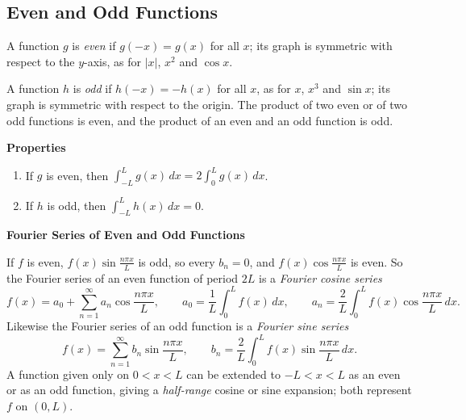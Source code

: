 \documentclass[11pt,a4paper]{article}
\theoremstyle{definition}
\newcommand{\subhead}[1]{%
  \par\medskip\noindent\textbf{#1}\par\nobreak\smallskip}
\begin{document}
{\color[wave]{485}\subsection{Even and Odd Functions}}

A function $g$ is \emph{even} if $g(-x) = g(x)$ for all $x$; its graph is
symmetric with respect to the $y$-axis, as for $|x|$, $x^2$ and $\cos x$.

\begin{figure}[H]
\centering
{}
\end{figure}

A function $h$ is \emph{odd} if $h(-x) = -h(x)$ for all $x$, as for $x$, $x^3$
and $\sin x$; its graph is symmetric with respect to the origin. The product of
two even or of two odd functions is even, and the product of an even and an odd
function is odd.

\subhead{Properties}
\begin{enumerate}
\item If $g$ is even, then $\int^L_{-L} g(x)\,dx = 2\int^L_0 g(x)\,dx$.

\item If $h$ is odd, then $\int^L_{-L} h(x)\,dx = 0$.
\end{enumerate}

\subhead{Fourier Series of Even and Odd Functions}

If $f$ is even, $f(x)\sin\frac{n\pi x}{L}$ is odd, so every $b_n = 0$, and
$f(x)\cos\frac{n\pi x}{L}$ is even. So the Fourier series of an even function of
period $2L$ is a \emph{Fourier cosine series}
\[f(x) = a_0 + \sum^{\infty}_{n=1}a_n \cos \frac{n\pi x}{L} ,\qquad a_0 =
\frac{1}{L}\int^L_0f(x)\,dx ,\qquad a_n = \frac{2}{L}\int^L_0 f(x) \cos \frac{n\pi
x}{L}\,dx .\]
Likewise the Fourier series of an odd function is a \emph{Fourier sine series}
\[f(x) = \sum^{\infty}_{n=1}b_n \sin \frac{n\pi x}{L} ,\qquad b_n =
\frac{2}{L}\int^L_0 f(x) \sin \frac{n\pi x}{L}\,dx .\]
A function given only on $0<x<L$ can be extended to $-L<x<L$ as an even or as an
odd function, giving a \emph{half-range} cosine or sine expansion; both represent
$f$ on $(0,L)$.
\end{document}
